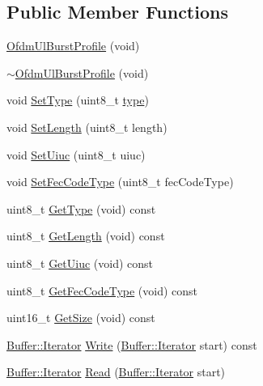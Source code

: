 \subsection*{Public Member Functions}
\begin{DoxyCompactItemize}
\item 
\hyperlink{classns3_1_1OfdmUlBurstProfile_a7456933f4cea3828b048e8535927c9c9}{Ofdm\+Ul\+Burst\+Profile} (void)
\item 
\hyperlink{classns3_1_1OfdmUlBurstProfile_a5cee58a5d330667b5d0d1512bab43636}{$\sim$\+Ofdm\+Ul\+Burst\+Profile} (void)
\item 
void \hyperlink{classns3_1_1OfdmUlBurstProfile_a60ea600da037b76adbefcbb967c30570}{Set\+Type} (uint8\+\_\+t \hyperlink{visualizer-ideas_8txt_add98db9e15e2a58cf2b57623e7aa893a}{type})
\item 
void \hyperlink{classns3_1_1OfdmUlBurstProfile_a26e9453e7d7a428b8a79342ed6a462fe}{Set\+Length} (uint8\+\_\+t length)
\item 
void \hyperlink{classns3_1_1OfdmUlBurstProfile_a2b078a5c2aaef2d8fc62be58ca2bd097}{Set\+Uiuc} (uint8\+\_\+t uiuc)
\item 
void \hyperlink{classns3_1_1OfdmUlBurstProfile_a4ea1fa42525c8f13f749fcefbe90ac8f}{Set\+Fec\+Code\+Type} (uint8\+\_\+t fec\+Code\+Type)
\item 
uint8\+\_\+t \hyperlink{classns3_1_1OfdmUlBurstProfile_aa9b462c755cdf237d8856974da9fbe4c}{Get\+Type} (void) const 
\item 
uint8\+\_\+t \hyperlink{classns3_1_1OfdmUlBurstProfile_aa1e5fd606e41942df689cef131596feb}{Get\+Length} (void) const 
\item 
uint8\+\_\+t \hyperlink{classns3_1_1OfdmUlBurstProfile_a3c43a992316a82eceb2f1a597c4f3b13}{Get\+Uiuc} (void) const 
\item 
uint8\+\_\+t \hyperlink{classns3_1_1OfdmUlBurstProfile_a56e00d7a443483ea06cd7e83a621acc6}{Get\+Fec\+Code\+Type} (void) const 
\item 
uint16\+\_\+t \hyperlink{classns3_1_1OfdmUlBurstProfile_aa399b7293350097143e48dd9b66ad009}{Get\+Size} (void) const 
\item 
\hyperlink{classns3_1_1Buffer_1_1Iterator}{Buffer\+::\+Iterator} \hyperlink{classns3_1_1OfdmUlBurstProfile_a8e5b9192fd3fccaba06ea0bd1170f9d1}{Write} (\hyperlink{classns3_1_1Buffer_1_1Iterator}{Buffer\+::\+Iterator} start) const 
\item 
\hyperlink{classns3_1_1Buffer_1_1Iterator}{Buffer\+::\+Iterator} \hyperlink{classns3_1_1OfdmUlBurstProfile_afc1f7cb1bc77bf18d412e5e1421c6327}{Read} (\hyperlink{classns3_1_1Buffer_1_1Iterator}{Buffer\+::\+Iterator} start)
\end{DoxyCompactItemize}
